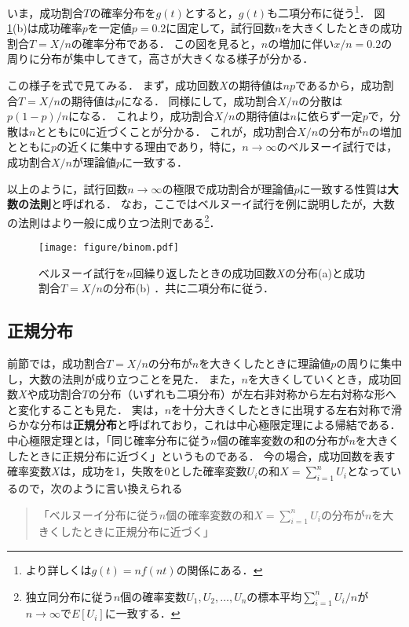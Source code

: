 %
いま，成功割合$ T $の確率分布を$ g(t) $とすると，$ g(t) $も二項分布に従う\footnote{より詳しくは$ g(t)=nf(nt) $の関係にある．}．
%
図\ref{fig:binom}(b)は成功確率$ p $を一定値$ p=0.2 $に固定して，試行回数$ n $を大きくしたときの成功割合$ T=X/n $の確率分布である．
%
この図を見ると，$ n $の増加に伴い$ x/n=0.2 $の周りに分布が集中してきて，高さが大きくなる様子が分かる．
%

%
この様子を式で見てみる．
%
まず，成功回数$ X $の期待値は$ np $であるから，成功割合$ T=X/n $の期待値は$ p $になる．
%
同様にして，成功割合$ X/n $の分散は$ p(1-p)/n $になる．
%
これより，成功割合$ X/n $の期待値は$ n $に依らず一定$ p $で，分散は$ n $とともに0に近づくことが分かる．
%
これが，成功割合$ X/n $の分布が$ n $の増加とともに$ p $の近くに集中する理由であり，特に，$ n\to \infty $のベルヌーイ試行では，成功割合$ X/n $が理論値$ p $に一致する．
%

%
以上のように，試行回数$ n\to \infty $の極限で成功割合が理論値$ p $に一致する性質は\textbf{大数の法則}と呼ばれる．
%
なお，ここではベルヌーイ試行を例に説明したが，大数の法則はより一般に成り立つ法則である\footnote{独立同分布に従う$ n $個の確率変数$ U_{1}, U_{2},\ldots, U_{n} $の標本平均$ \sum_{i=1}^{n}U_{i}/n $が$ n\to\infty $で$ E[U_{i}] $に一致する．}．
%

%
\begin{figure}[H]
	\centering
	\texttt{[image: figure/binom.pdf]}
	\caption{ベルヌーイ試行を$ n $回繰り返したときの成功回数$ X $の分布(a)と成功割合$ T=X/n $の分布(b) ．共に二項分布に従う．}
	\label{fig:binom}
\end{figure}
%



\subsection{正規分布}
%
前節では，成功割合$ T=X/n $の分布が$ n $を大きくしたときに理論値$ p $の周りに集中し，大数の法則が成り立つことを見た．
%
また，$ n $を大きくしていくとき，成功回数$ X $や成功割合$ T $の分布（いずれも二項分布）が左右非対称から左右対称な形へと変化することも見た．
%
実は，$ n $を十分大きくしたときに出現する左右対称で滑らかな分布は\textbf{正規分布}と呼ばれており，これは中心極限定理による帰結である．
%
中心極限定理とは，「同じ確率分布に従う$ n $個の確率変数の和の分布が$ n $を大きくしたときに正規分布に近づく」というものである．
%
今の場合，成功回数を表す確率変数$ X $は，成功を1，失敗を0とした確率変数$ U_{i} $の和$ \displaystyle X = \sum_{i=1}^{n} U_{i} $となっているので，次のように言い換えられる
%
\begin{quotation}
	「ベルヌーイ分布に従う$ n $個の確率変数の和$ \displaystyle X = \sum_{i=1}^{n} U_{i} $の分布が$ n $を大きくしたときに正規分布に近づく」
\end{quotation}
%
%

